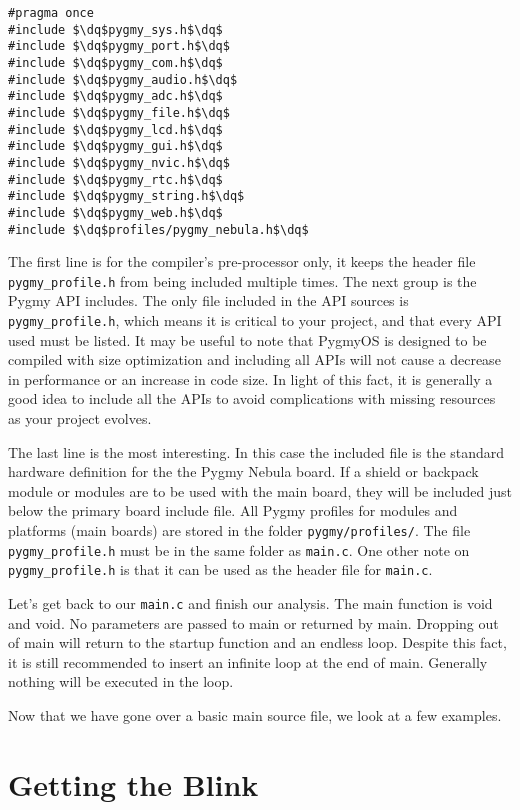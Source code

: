 \documentclass{article}
\newcommand{\dq}{\textquotedbl}
\begin{document}
\begin{lstlisting}
#pragma once
#include $\dq$pygmy_sys.h$\dq$
#include $\dq$pygmy_port.h$\dq$
#include $\dq$pygmy_com.h$\dq$
#include $\dq$pygmy_audio.h$\dq$
#include $\dq$pygmy_adc.h$\dq$
#include $\dq$pygmy_file.h$\dq$
#include $\dq$pygmy_lcd.h$\dq$
#include $\dq$pygmy_gui.h$\dq$
#include $\dq$pygmy_nvic.h$\dq$
#include $\dq$pygmy_rtc.h$\dq$
#include $\dq$pygmy_string.h$\dq$
#include $\dq$pygmy_web.h$\dq$
#include $\dq$profiles/pygmy_nebula.h$\dq$
\end{lstlisting}

The first line is for the compiler's pre-processor only, it keeps the header file \verb|pygmy_profile.h| from being included multiple times. The next group is the Pygmy API includes. The only file included in the API sources is \verb|pygmy_profile.h|, which means it is critical to your project, and that every API used must be listed. It may be useful to note that PygmyOS is designed to be compiled with size optimization and including all APIs will not cause a decrease in performance or an increase in code size. In light of this fact, it is generally a good idea to include all the APIs to avoid complications with missing resources as your project evolves.

The last line is the most interesting. In this case the included file is the standard hardware definition for the the Pygmy Nebula board. If a shield or backpack module or modules are to be used with the main board, they will be included just below the primary board include file. All Pygmy profiles for modules and platforms (main boards) are stored in the folder \verb|pygmy/profiles/|. The file \verb|pygmy_profile.h| must be in the same folder as \verb|main.c|. One other note on \verb|pygmy_profile.h| is that it can be used as the header file for \verb|main.c|.

Let's get back to our \verb|main.c| and finish our analysis. The main function is void and void. No parameters are passed to main or returned by main. Dropping out of main will return to the startup function and an endless loop. Despite this fact, it is still recommended to insert an infinite loop at the end of main. Generally nothing will be executed in the loop.

Now that we have gone over a basic main source file, we look at a few examples.

\section{Getting the Blink}
\end{document}
